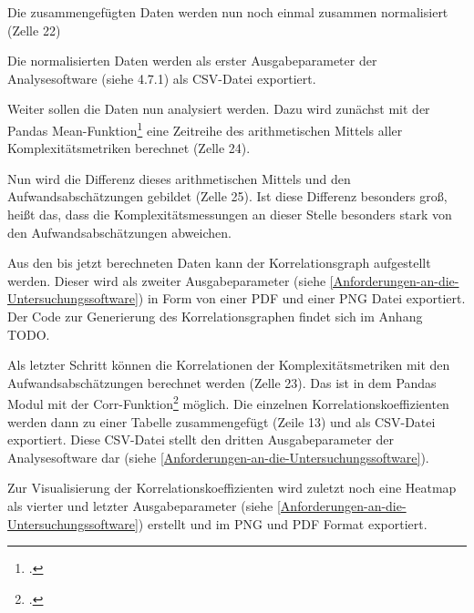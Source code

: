 \lstset{style=pythonStyle}


Die zusammengefügten Daten werden nun noch einmal zusammen normalisiert
(Zelle 22)

\lstset{style=pythonStyle}


Die normalisierten Daten werden als erster Ausgabeparameter der
Analysesoftware (siehe 4.7.1) als \ac{CSV}-Datei exportiert.

Weiter sollen die Daten nun analysiert werden. Dazu wird zunächst mit
der Pandas Mean-Funktion\footcite[Vgl. ][]{PandasDataFrameMean} eine Zeitreihe
des arithmetischen Mittels aller Komplexitätsmetriken berechnet (Zelle
24).

\lstset{style=pythonStyle}


Nun wird die Differenz dieses arithmetischen Mittels und den
Aufwandsabschätzungen gebildet (Zelle 25). Ist diese Differenz besonders
groß, heißt das, dass die Komplexitätsmessungen an dieser Stelle
besonders stark von den Aufwandsabschätzungen abweichen.

\lstset{style=pythonStyle}


Aus den bis jetzt berechneten Daten kann der Korrelationsgraph
aufgestellt werden. Dieser wird als zweiter Ausgabeparameter (siehe \ref{Anforderungen-an-die-Untersuchungssoftware}) in Form von einer
\ac{PDF} und einer \ac{PNG} Datei exportiert. Der Code zur Generierung des Korrelationsgraphen findet sich im Anhang TODO.

Als letzter Schritt können die Korrelationen der Komplexitätsmetriken
mit den Aufwandsabschätzungen berechnet werden (Zelle 23). Das ist in
dem Pandas Modul mit der Corr-Funktion\footcite[Vgl. ][]{PandasDataFrameCorr}
möglich. Die einzelnen Korrelationskoeffizienten werden dann zu einer
Tabelle zusammengefügt (Zeile 13) und als \ac{CSV}-Datei exportiert. Diese
\ac{CSV}-Datei stellt den dritten Ausgabeparameter der Analysesoftware dar
(siehe \ref{Anforderungen-an-die-Untersuchungssoftware}).

Zur Visualisierung der Korrelationskoeffizienten wird zuletzt noch eine
Heatmap als vierter und letzter Ausgabeparameter (siehe \ref{Anforderungen-an-die-Untersuchungssoftware}) erstellt
und im \ac{PNG} und \ac{PDF} Format exportiert.

